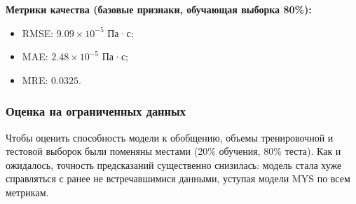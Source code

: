 \documentclass[a4paper,12pt]{article}
\begin{document}
      \begin{minipage}{\textwidth}
        \textbf{Метрики качества (базовые признаки, обучающая выборка 80\%):}
        \begin{itemize}
          \item RMSE: \( 9.09 \times 10^{-5} \) Па·с;
          \item MAE: \( 2.48 \times 10^{-5} \) Па·с;
          \item MRE: \( 0.0325 \).
        \end{itemize}
      \end{minipage}

    \subsubsection{Оценка на ограниченных данных}

      Чтобы оценить способность модели к обобщению, объемы тренировочной и тестовой выборок были поменяны местами (20\% обучения, 80\% теста). Как и ожидалось, точность предсказаний существенно снизилась: модель стала хуже справляться с ранее не встречавшимися данными, уступая модели MYS по всем метрикам.
      
\end{document}
